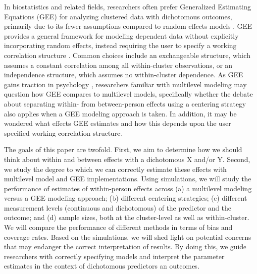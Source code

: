 \documentclass[stu]{apa7}
\begin{document}

In biostatistics and related fields, researchers often prefer Generalized Estimating Equations (GEE) for analyzing clustered data with dichotomous outcomes, primarily due to its fewer assumptions compared to random-effects models \parencite[]{mcneish_unnecessary_2017}. GEE provides a general framework for modeling dependent data without explicitly incorporating random effects, instead requiring the user to specify a working correlation structure \parencite{zeger_models_1988}. Common choices include an exchangeable structure, which assumes a constant correlation among all within-cluster observations, or an independence structure, which assumes no within-cluster dependence. As GEE gains traction in psychology \parencite[]{mcneish_unnecessary_2017}, researchers familiar with multilevel modeling may question how GEE compares to multilevel models, specifically whether the debate about separating within- from between-person effects using a centering strategy also applies when a GEE modeling approach is taken. In addition, it may be wondered what effects GEE estimates and how this depends upon the user specified working correlation structure.


The goals of this paper are twofold. First, we aim to determine how we should think about within and between effects with a dichotomous X and/or Y. Second, we study the degree to which we can correctly estimate these effects with multilevel model and GEE implementations. Using simulations, we will study the performance of estimates of within-person effects across (a) a multilevel modeling versus a GEE modeling approach; (b) different centering strategies; (c) different measurement levels (continuous and dichotomous) of the predictor and the outcome; and (d) sample sizes, both at the cluster-level as well as within-cluster. We will compare the performance of different methods in terms of bias and coverage rates. Based on the simulations, we will shed light on potential concerns that may endanger the correct interpretation of results. By doing this, we guide researchers with correctly specifying models and interpret the parameter estimates in the context of dichotomous predictors an outcomes.
\end{document}
